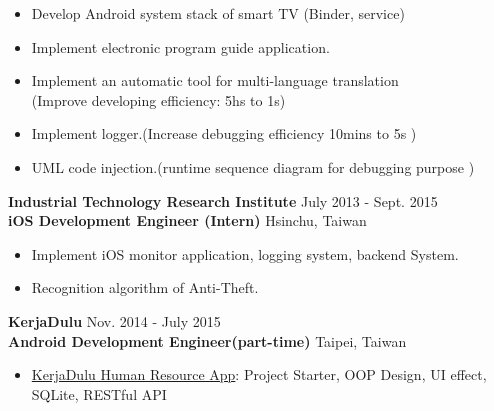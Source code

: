\documentclass{res}
\begin{document}
\begin{resume}
				\begin{itemize}[leftmargin=*]
					\item Develop Android system stack of smart TV (Binder, service)	
					\vspace{-0.05in}
					\item Implement electronic program guide application.
					\vspace{-0.05in}
					\item Implement an automatic tool for multi-language translation \\(Improve developing efficiency: 5hs to 1s)
					\vspace{-0.05in}		
					\item Implement logger.(Increase debugging efficiency 10mins to 5s )
					\vspace{-0.05in}	
					\item UML code injection.(runtime sequence diagram for debugging purpose )
				\end{itemize}
				\vspace{-0.1in}
				{\bf Industrial Technology Research Institute } {\hfill July 2013 - Sept. 2015}\\	
				{\bf iOS Development Engineer (Intern)}                        {\hfill Hsinchu, Taiwan}

				\begin{itemize}[leftmargin=*]
					\item Implement iOS monitor application, logging system, backend System.
					\vspace{-0.05in} 
					\item Recognition algorithm of Anti-Theft.
					\vspace{-0.05in}
				\end{itemize}
				\vspace{-0.1in}

	 			{\bf KerjaDulu }                                {\hfill  Nov. 2014 - July 2015}\\
				{\bf Android Development Engineer(part-time)}			    	 {\hfill Taipei, Taiwan}
		
				\begin{itemize}[leftmargin=*]
					\item {\href{https://play.google.com/store/apps/details?id=com.kerjadulu.kerjadulu&hl=zh_TW}{KerjaDulu Human Resource App}}: Project Starter, OOP Design, UI effect, SQLite, RESTful API
				\end{itemize}
				\vspace{-0.1in}


\end{resume}
\end{document}
